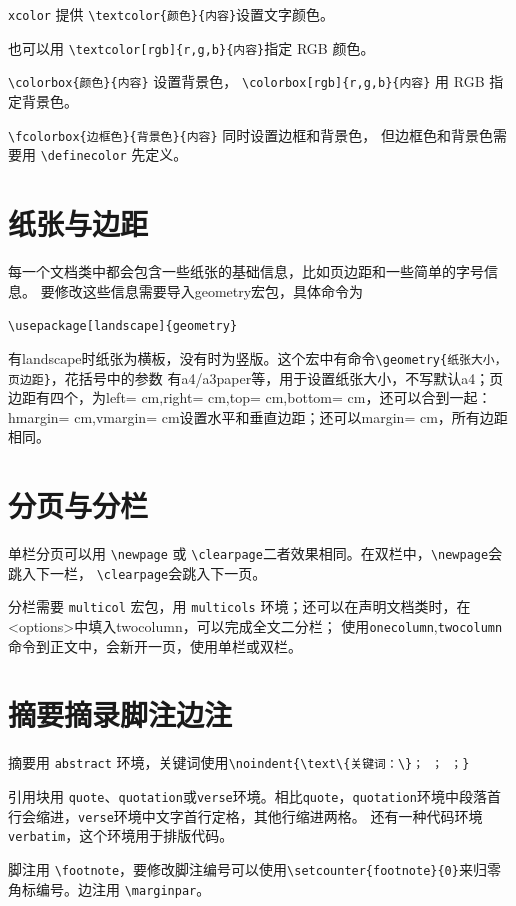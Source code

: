 \documentclass[12pt,a4paper]{ctexart}
\begin{document}
\texttt{xcolor} 提供 \verb|\textcolor{颜色}{内容}|\allowbreak 设置文字颜色。

也可以用 \verb|\textcolor[rgb]{r,g,b}{内容}|\allowbreak 指定 RGB 颜色。

\verb|\colorbox{颜色}{内容}| 设置背景色，
\verb|\colorbox[rgb]{r,g,b}{内容}| 用 RGB 指定背景色。

\verb|\fcolorbox{边框色}{背景色}{内容}| 同时设置边框和背景色，
但边框色和背景色需要用 \verb|\definecolor| 先定义。

\section{纸张与边距}
每一个文档类中都会包含一些纸张的基础信息，比如页边距和一些简单的字号信息。
要修改这些信息需要导入geometry宏包，具体命令为
\begin{center}
  \texttt{\textbackslash usepackage[landscape]\{geometry\}}
\end{center}
有landscape时纸张为横板，没有时为竖版。这个宏中有命令\texttt{\textbackslash geometry\{纸张大小，页边距\}}，花括号中的参数
有a4/a3paper等，用于设置纸张大小，不写默认a4；页边距有四个，为left= cm,right= cm,top= cm,bottom= cm，还可以合到一起：hmargin= cm,vmargin= cm设置水平和垂直边距；还可以margin= cm，所有边距相同。


\section{分页与分栏}
单栏分页可以用 \verb|\newpage| 或 \verb|\clearpage|二者效果相同。在双栏中，\verb|\newpage|会跳入下一栏，
\verb|\clearpage|会跳入下一页。

分栏需要 \verb|multicol| 宏包，用 \verb|multicols| 环境；还可以在声明文档类时，在<options>中填入twocolumn，可以完成全文二分栏；
使用\verb|onecolumn|,\verb|twocolumn|命令到正文中，会新开一页，使用单栏或双栏。

\section{摘要摘录脚注边注}
摘要用 \verb|abstract| 环境，关键词使用\verb|\noindent{\text\{关键词：\}； ； ；}|

引用块用 \verb|quote|、\verb|quotation|或\verb|verse|环境。相比\verb|quote|，\verb|quotation|环境中段落首行会缩进，\verb|verse|环境中文字首行定格，其他行缩进两格。
还有一种代码环境\verb|verbatim|，这个环境用于排版代码。

脚注用 \verb|\footnote|，要修改脚注编号可以使用\verb|\setcounter{footnote}{0}|来归零角标编号。边注用 \verb|\marginpar|。
\end{document}
